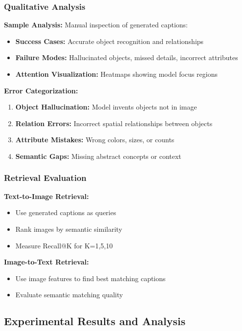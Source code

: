 \documentclass[conference]{IEEEtran}
\begin{document}
\subsubsection{Qualitative Analysis}
\label{sec:q1_qualitative_eval}

\textbf{Sample Analysis:} Manual inspection of generated captions:
\begin{itemize}
  \item \textbf{Success Cases:} Accurate object recognition and relationships
  \item \textbf{Failure Modes:} Hallucinated objects, missed details, incorrect attributes
  \item \textbf{Attention Visualization:} Heatmaps showing model focus regions
\end{itemize}

\textbf{Error Categorization:}
\begin{enumerate}
  \item \textbf{Object Hallucination:} Model invents objects not in image
  \item \textbf{Relation Errors:} Incorrect spatial relationships between objects
  \item \textbf{Attribute Mistakes:} Wrong colors, sizes, or counts
  \item \textbf{Semantic Gaps:} Missing abstract concepts or context
\end{enumerate}

\subsubsection{Retrieval Evaluation}
\label{sec:q1_retrieval_eval}

\textbf{Text-to-Image Retrieval:}
\begin{itemize}
  \item Use generated captions as queries
  \item Rank images by semantic similarity
  \item Measure Recall@K for K=1,5,10
\end{itemize}

\textbf{Image-to-Text Retrieval:}
\begin{itemize}
  \item Use image features to find best matching captions
  \item Evaluate semantic matching quality
\end{itemize}

\subsection{Experimental Results and Analysis}
\label{sec:q1_results}
\end{document}

